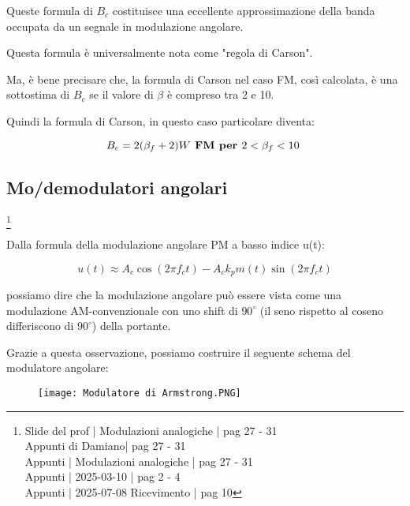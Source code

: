 Queste formula di $B_c$ costituisce una eccellente approssimazione della banda occupata da un segnale in modulazione angolare. \newline 

Questa formula è universalmente nota come "regola di Carson". \newline 

Ma, è bene precisare che, la formula di Carson nel caso FM, così calcolata, è una sottostima di $B_c$ se il valore di $\beta$ 
è compreso tra 2 e 10. \newline 

Quindi la formula di Carson, in questo caso particolare diventa: 

{
    \Large 
    \begin{equation}
        B_c = 2 (\beta_f + 2 ) W \textbf{ FM per  $ 2 < \beta_f < 10$ }
    \end{equation}
}

\newpage 

\subsection{Mo/demodulatori angolari}
\footnote{Slide del prof | Modulazioni analogiche | pag 27 - 31\\  
Appunti di Damiano| pag 27 - 31\\
Appunti | Modulazioni analogiche | pag 27 - 31\\
Appunti | 2025-03-10 | pag 2 - 4\\ 
Appunti | 2025-07-08 Ricevimento | pag 10
} 

Dalla formula della modulazione angolare PM a basso indice u(t): 

{
    \Large 
    \begin{equation}
        u(t) 
        \approx
        A_c \cos(2 \pi f_c t)
        - 
        A_c k_p m(t) \sin(2 \pi f_c t) 
    \end{equation}
}

possiamo dire che la modulazione angolare può essere vista come una modulazione AM-convenzionale con uno shift di $90^{\circ}$
(il seno rispetto al coseno differiscono di $90^{\circ}$) della portante. \newline 

Grazie a questa osservazione, possiamo costruire il seguente schema del modulatore angolare: 

\begin{figure}[h]
    \centering
    \texttt{[image: Modulatore di Armstrong.PNG]}
\end{figure}

